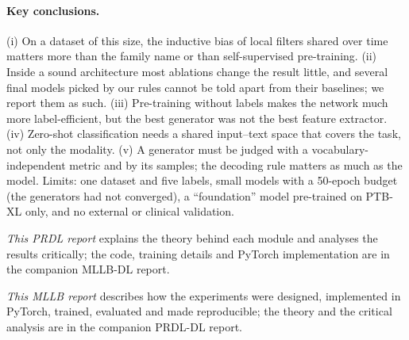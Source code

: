 \paragraph{Key conclusions.}
(i) On a dataset of this size, the inductive bias of local filters shared over time matters more than
the family name or than self-supervised pre-training. (ii) Inside a sound architecture most ablations
change the result little, and several final models picked by our rules cannot be told apart from their
baselines; we report them as such. (iii) Pre-training without labels makes the network much more
label-efficient, but the best generator was not the best feature extractor. (iv) Zero-shot
classification needs a shared input--text space that covers the task, not only the modality.
(v) A generator must be judged with a vocabulary-independent metric and by its samples; the decoding
rule matters as much as the model. Limits: one dataset and five labels, small models with a 50-epoch
budget (the generators had not converged), a ``foundation'' model pre-trained on PTB-XL only, and no
external or clinical validation.
\ifprdl
\par\smallskip\noindent\textit{This PRDL report} explains the theory behind each module and analyses the
results critically; the code, training details and PyTorch implementation are in the companion
MLLB-DL report.
\else
\par\smallskip\noindent\textit{This MLLB report} describes how the experiments were designed,
implemented in PyTorch, trained, evaluated and made reproducible; the theory and the critical analysis
are in the companion PRDL-DL report.
\fi
